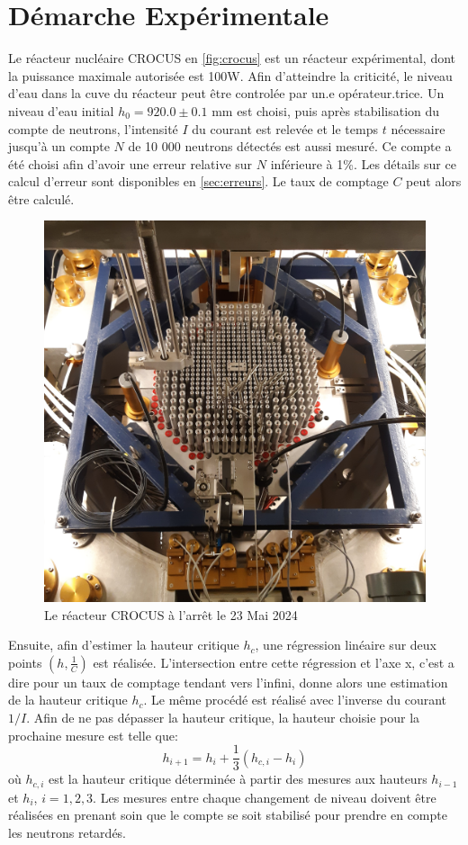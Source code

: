 \section{Démarche Expérimentale}
Le réacteur nucléaire CROCUS en \autoref{fig:crocus} est un réacteur expérimental, dont la puissance maximale autorisée est 100W. Afin d'atteindre la criticité, le niveau d'eau dans la cuve du réacteur peut être controlée par un.e opérateur.trice. Un niveau d'eau initial \(h_0 = 920.0 \pm 0.1\) mm est choisi, puis après stabilisation du compte de neutrons, l'intensité $I$ du courant est relevée et le temps \(t\) nécessaire jusqu'à un compte \(N\) de 10 000 neutrons détectés est aussi mesuré. Ce compte a été choisi afin d'avoir une erreur relative sur \(N\) inférieure à 1\%. Les détails sur ce calcul d'erreur sont disponibles en \autoref{sec:erreurs}. Le taux de comptage \(C\) peut alors être calculé. 
\begin{figure}
    \includegraphics*[width=\linewidth]{figures/crocus.jpg}
    \caption{Le réacteur CROCUS à l'arrêt le 23 Mai 2024}
    \label{fig:crocus}
\end{figure}

Ensuite, afin d'estimer la hauteur critique \(h_c\), une régression linéaire sur deux points \((h, \frac{1}{C})\) est réalisée. L'intersection entre cette régression et l'axe x, c'est a dire pour un taux de comptage tendant vers l'infini, donne alors une estimation de la hauteur critique \(h_c\). Le même procédé est réalisé avec l'inverse du courant $1/I$. Afin de ne pas dépasser la hauteur critique, la hauteur choisie pour la prochaine mesure est telle que:
\begin{equation}
    h_{i+1} = h_i + \frac{1}{3}(h_{c,i} - h_i)
\end{equation}
où \(h_{c,i}\) est la hauteur critique déterminée à partir des mesures aux hauteurs \(h_{i-1}\) et \(h_{i}\), \(i=1,2,3\). Les mesures entre chaque changement de niveau doivent être réalisées en prenant soin que le compte se soit stabilisé pour prendre en compte les neutrons retardés.

